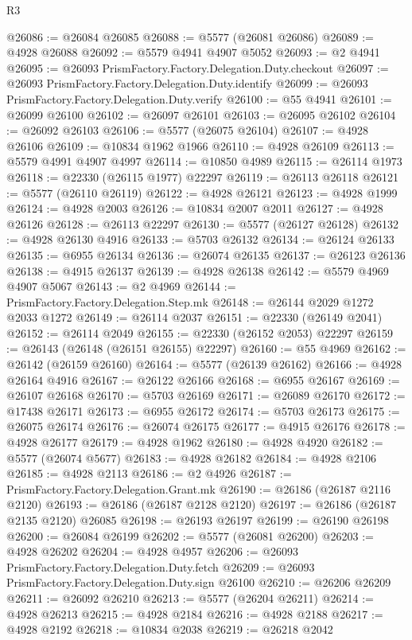 \begin{lexlean}{R3}
\begin{coremodule}
@26086 := @26084 @26085
@26088 := @5577 (@26081 @26086)
@26089 := @4928 @26088
@26092 := @5579 @4941 @4907 @5052
@26093 := @2 @4941
@26095 := @26093 PrismFactory.Factory.Delegation.Duty.checkout
@26097 := @26093 PrismFactory.Factory.Delegation.Duty.identify
@26099 := @26093 PrismFactory.Factory.Delegation.Duty.verify
@26100 := @55 @4941
@26101 := @26099 @26100
@26102 := @26097 @26101
@26103 := @26095 @26102
@26104 := @26092 @26103
@26106 := @5577 (@26075 @26104)
@26107 := @4928 @26106
@26109 := @10834 @1962 @1966
@26110 := @4928 @26109
@26113 := @5579 @4991 @4907 @4997
@26114 := @10850 @4989
@26115 := @26114 @1973
@26118 := @22330 (@26115 @1977) @22297
@26119 := @26113 @26118
@26121 := @5577 (@26110 @26119)
@26122 := @4928 @26121
@26123 := @4928 @1999
@26124 := @4928 @2003
@26126 := @10834 @2007 @2011
@26127 := @4928 @26126
@26128 := @26113 @22297
@26130 := @5577 (@26127 @26128)
@26132 := @4928 @26130 @4916
@26133 := @5703 @26132
@26134 := @26124 @26133
@26135 := @6955 @26134
@26136 := @26074 @26135
@26137 := @26123 @26136
@26138 := @4915 @26137
@26139 := @4928 @26138
@26142 := @5579 @4969 @4907 @5067
@26143 := @2 @4969
@26144 := PrismFactory.Factory.Delegation.Step.mk
@26148 := @26144 @2029 @1272 @2033 @1272
@26149 := @26114 @2037
@26151 := @22330 (@26149 @2041)
@26152 := @26114 @2049
@26155 := @22330 (@26152 @2053) @22297
@26159 := @26143 (@26148 (@26151 @26155) @22297)
@26160 := @55 @4969
@26162 := @26142 (@26159 @26160)
@26164 := @5577 (@26139 @26162)
@26166 := @4928 @26164 @4916
@26167 := @26122 @26166
@26168 := @6955 @26167
@26169 := @26107 @26168
@26170 := @5703 @26169
@26171 := @26089 @26170
@26172 := @17438 @26171
@26173 := @6955 @26172
@26174 := @5703 @26173
@26175 := @26075 @26174
@26176 := @26074 @26175
@26177 := @4915 @26176
@26178 := @4928 @26177
@26179 := @4928 @1962
@26180 := @4928 @4920
@26182 := @5577 (@26074 @5677)
@26183 := @4928 @26182
@26184 := @4928 @2106
@26185 := @4928 @2113
@26186 := @2 @4926
@26187 := PrismFactory.Factory.Delegation.Grant.mk
@26190 := @26186 (@26187 @2116 @2120)
@26193 := @26186 (@26187 @2128 @2120)
@26197 := @26186 (@26187 @2135 @2120) @26085
@26198 := @26193 @26197
@26199 := @26190 @26198
@26200 := @26084 @26199
@26202 := @5577 (@26081 @26200)
@26203 := @4928 @26202
@26204 := @4928 @4957
@26206 := @26093 PrismFactory.Factory.Delegation.Duty.fetch
@26209 := @26093 PrismFactory.Factory.Delegation.Duty.sign @26100
@26210 := @26206 @26209
@26211 := @26092 @26210
@26213 := @5577 (@26204 @26211)
@26214 := @4928 @26213
@26215 := @4928 @2184
@26216 := @4928 @2188
@26217 := @4928 @2192
@26218 := @10834 @2038
@26219 := @26218 @2042

\end{coremodule}
\end{lexlean}
